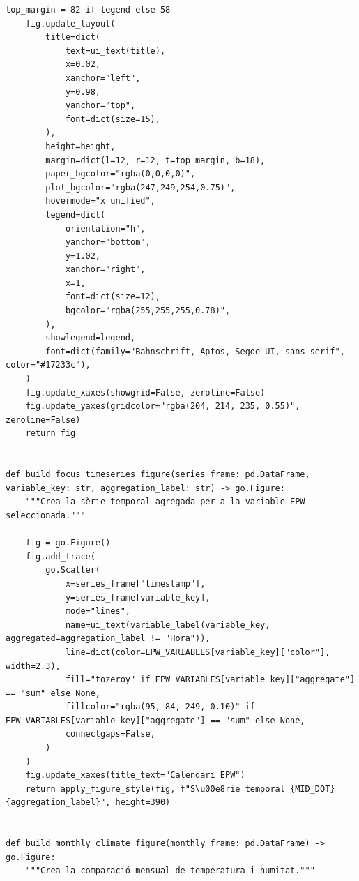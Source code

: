 \documentclass[10pt,a4paper]{article}
\begin{document}
\begin{lstlisting}[style=studioPython,caption={backend/epw\_figures.py},label={lst:backend-epw-figures-py}]
    top_margin = 82 if legend else 58
    fig.update_layout(
        title=dict(
            text=ui_text(title),
            x=0.02,
            xanchor="left",
            y=0.98,
            yanchor="top",
            font=dict(size=15),
        ),
        height=height,
        margin=dict(l=12, r=12, t=top_margin, b=18),
        paper_bgcolor="rgba(0,0,0,0)",
        plot_bgcolor="rgba(247,249,254,0.75)",
        hovermode="x unified",
        legend=dict(
            orientation="h",
            yanchor="bottom",
            y=1.02,
            xanchor="right",
            x=1,
            font=dict(size=12),
            bgcolor="rgba(255,255,255,0.78)",
        ),
        showlegend=legend,
        font=dict(family="Bahnschrift, Aptos, Segoe UI, sans-serif", color="#17233c"),
    )
    fig.update_xaxes(showgrid=False, zeroline=False)
    fig.update_yaxes(gridcolor="rgba(204, 214, 235, 0.55)", zeroline=False)
    return fig


def build_focus_timeseries_figure(series_frame: pd.DataFrame, variable_key: str, aggregation_label: str) -> go.Figure:
    """Crea la sèrie temporal agregada per a la variable EPW seleccionada."""

    fig = go.Figure()
    fig.add_trace(
        go.Scatter(
            x=series_frame["timestamp"],
            y=series_frame[variable_key],
            mode="lines",
            name=ui_text(variable_label(variable_key, aggregated=aggregation_label != "Hora")),
            line=dict(color=EPW_VARIABLES[variable_key]["color"], width=2.3),
            fill="tozeroy" if EPW_VARIABLES[variable_key]["aggregate"] == "sum" else None,
            fillcolor="rgba(95, 84, 249, 0.10)" if EPW_VARIABLES[variable_key]["aggregate"] == "sum" else None,
            connectgaps=False,
        )
    )
    fig.update_xaxes(title_text="Calendari EPW")
    return apply_figure_style(fig, f"S\u00e8rie temporal {MID_DOT} {aggregation_label}", height=390)


def build_monthly_climate_figure(monthly_frame: pd.DataFrame) -> go.Figure:
    """Crea la comparació mensual de temperatura i humitat."""


\end{lstlisting}
\end{document}
